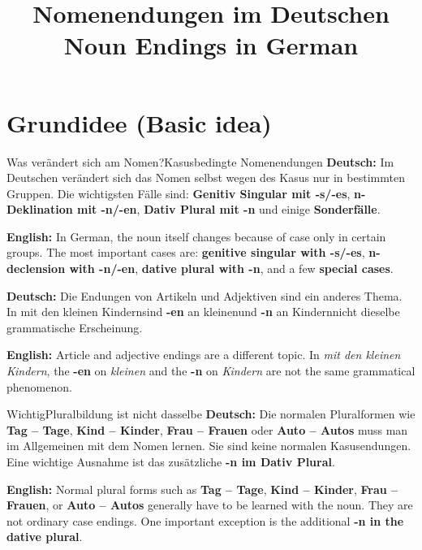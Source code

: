\documentclass[a4paper,11pt]{article}
\title{Nomenendungen im Deutschen\\\large \textnormal{Noun Endings in German}}
\date{}
\newcommand{\GermanText}[1]{\textbf{Deutsch: }#1\par}
\newcommand{\EnglishText}[1]{{\small\color{SoftGray}\textbf{English: }#1\par}}
\begin{document}
\maketitle
\tableofcontents
\newpage

\section{Grundidee \textnormal{(Basic idea)}}
\begin{grammarentry}{Was verändert sich am Nomen?}{Kasusbedingte Nomenendungen}
\GermanText{Im Deutschen verändert sich das Nomen selbst wegen des Kasus nur in bestimmten Gruppen. Die wichtigsten Fälle sind: \textbf{Genitiv Singular mit -s/-es}, \textbf{n-Deklination mit -n/-en}, \textbf{Dativ Plural mit -n} und einige \textbf{Sonderfälle}.}
\EnglishText{In German, the noun itself changes because of case only in certain groups. The most important cases are: \textbf{genitive singular with -s/-es}, \textbf{n-declension with -n/-en}, \textbf{dative plural with -n}, and a few \textbf{special cases}.}

\GermanText{Die Endungen von Artikeln und Adjektiven sind ein anderes Thema. In \glqq mit den kleinen Kindern\grqq sind \textbf{-en} an \glqq kleinen\grqq und \textbf{-n} an \glqq Kindern\grqq nicht dieselbe grammatische Erscheinung.}
\EnglishText{Article and adjective endings are a different topic. In \emph{mit den kleinen Kindern}, the \textbf{-en} on \emph{kleinen} and the \textbf{-n} on \emph{Kindern} are not the same grammatical phenomenon.}
\end{grammarentry}

\begin{grammarentry}{Wichtig}{Pluralbildung ist nicht dasselbe}
\GermanText{Die normalen Pluralformen wie \textbf{Tag -- Tage}, \textbf{Kind -- Kinder}, \textbf{Frau -- Frauen} oder \textbf{Auto -- Autos} muss man im Allgemeinen mit dem Nomen lernen. Sie sind keine normalen Kasusendungen. Eine wichtige Ausnahme ist das zusätzliche \textbf{-n im Dativ Plural}.}
\EnglishText{Normal plural forms such as \textbf{Tag -- Tage}, \textbf{Kind -- Kinder}, \textbf{Frau -- Frauen}, or \textbf{Auto -- Autos} generally have to be learned with the noun. They are not ordinary case endings. One important exception is the additional \textbf{-n in the dative plural}.}
\end{grammarentry}
\end{document}
